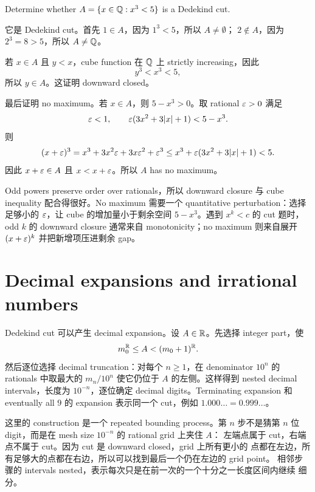 \begin{exerciseblock}
Determine whether \(A=\{x\in\mathbb{Q}:x^3<5\}\) is a Dedekind cut.
\end{exerciseblock}

\begin{solution}
它是 Dedekind cut。首先 \(1\in A\)，因为 \(1^3<5\)，所以 \(A\ne\emptyset\)；
\(2\notin A\)，因为 \(2^3=8>5\)，所以 \(A\ne\mathbb{Q}\)。

若 \(x\in A\) 且 \(y<x\)，cube function 在 \(\mathbb{Q}\) 上 strictly increasing，因此
\[
  y^3<x^3<5,
\]
所以 \(y\in A\)。这证明 downward closed。

最后证明 no maximum。若 \(x\in A\)，则 \(5-x^3>0\)。取 rational \(\varepsilon>0\) 满足
\[
  \varepsilon<1,\qquad
  \varepsilon(3x^2+3|x|+1)<5-x^3.
\]
则
\[
  (x+\varepsilon)^3
  =x^3+3x^2\varepsilon+3x\varepsilon^2+\varepsilon^3
  \leq x^3+\varepsilon(3x^2+3|x|+1)
  <5.
\]
因此 \(x+\varepsilon\in A\) 且 \(x<x+\varepsilon\)。所以 \(A\) has no maximum。
\end{solution}

\begin{explanation}
Odd powers preserve order over rationals，所以 downward closure 与 cube inequality
配合得很好。No maximum 需要一个 quantitative perturbation：选择足够小的
\(\varepsilon\)，让 cube 的增加量小于剩余空间 \(5-x^3\)。遇到 \(x^k<c\) 的 cut 题时，
odd \(k\) 的 downward closure 通常来自 monotonicity；no maximum 则来自展开
\((x+\varepsilon)^k\) 并把新增项压进剩余 gap。
\end{explanation}

\section{Decimal expansions and irrational numbers}

Dedekind cut 可以产生 decimal expansion。设 \(A\in\mathbb{R}\)。先选择 integer part，使
\[
  m_0^{\mathbb{R}}\leq A<(m_0+1)^{\mathbb{R}}.
\]
然后逐位选择 decimal truncation：对每个 \(n\geq1\)，在 denominator \(10^n\) 的
rationals 中取最大的 \(m_n/10^n\) 使它仍位于 \(A\) 的左侧。这样得到 nested
decimal intervals，长度为 \(10^{-n}\)，逐位确定 decimal digits。Terminating
expansion 和 eventually all \(9\) 的 expansion 表示同一个 cut，例如
\(1.000\ldots=0.999\ldots\)。

这里的 construction 是一个 repeated bounding process。第 \(n\) 步不是猜第
\(n\) 位 digit，而是在 mesh size \(10^{-n}\) 的 rational grid 上夹住 \(A\)：
左端点属于 cut，右端点不属于 cut。因为 cut 是 downward closed，grid 上所有更小的
点都在左边，所有足够大的点都在右边，所以可以找到最后一个仍在左边的 grid point。
相邻步骤的 intervals nested，表示每次只是在前一次的一个十分之一长度区间内继续
细分。

